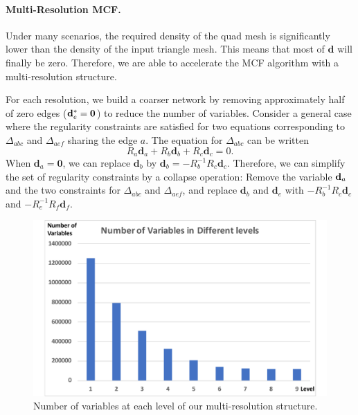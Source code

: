 
\paragraph*{Multi-Resolution MCF.}
Under many scenarios, the required density of the quad mesh is significantly lower than the density of the input triangle mesh. This means that most of ${\textbf{d}}$ will finally be zero. Therefore, we are able to accelerate the MCF algorithm with a multi-resolution structure.

For each resolution, we build a coarser network by removing approximately half of zero edges (${\mathbf{d}}^*_e=\textbf{0}$) to reduce the number of variables.  Consider a general case where the regularity constraints are satisfied for two equations corresponding to $\Delta_{abc}$ and $\Delta_{aef}$ sharing the edge $a$. The equation for $\Delta_{abc}$ can be written
\begin{equation*}
R_a {\textbf{d}}_a + R_b {\textbf{d}}_b + R_c {\textbf{d}}_c = 0.
\end{equation*}
When ${\textbf{d}}_a=\textbf{0}$, we can replace ${\textbf{d}}_b$ by ${\textbf{d}}_b=-R_b^{-1}R_c{\textbf{d}}_c$. Therefore, we can simplify the set of regularity constraints by a collapse operation: Remove the variable ${\mathbf{d}}_a$ and the two constraints for $\Delta_{abc}$ and $\Delta_{aef}$, and replace ${\textbf{d}}_b$ and ${\textbf{d}}_e$ with $-R_b^{-1}R_c{\textbf{d}}_c$ and $-R_e^{-1}R_f{\textbf{d}}_f$.

\begin{figure}
\centering
\includegraphics[width=0.6\linewidth]{quadriflow/diagram/hierarchy.pdf}
\caption{Number of variables at each level of our multi-resolution structure.}
\label{fig:quad-hierarchy}
\end{figure}

